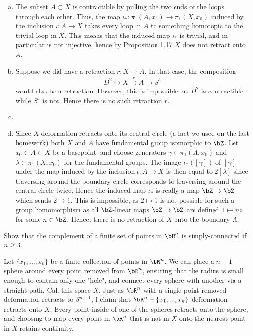 \begin{homework}[e]
\begin{prf}
\begin{enumerate}[(a)]
    \item The subset $A\subset X$ is contractible by pulling the two ends of the loops through each other. Thus, the map $\iota_*:\pi_1(A,x_0) \to \pi_1(X,x_0)$ induced by the inclusion $\iota:A\to X$ takes every loop in $A$ to something homotopic to the trivial loop in $X$. This means that the induced map $\iota_*$ is trivial, and in particular is not injective, hence by Proposition 1.17 $X$ does not retract onto $A$.
    \item Suppose we did have a retraction $r:X\to A$. In that case, the composition
      \begin{align*}
        D^2 \hookrightarrow X \xrightarrow{r} A \to S^1
      \end{align*}
      would also be a retraction. However, this is impossible, as $D^2$ is contractible while $S^1$ is not. Hence there is no such retraction $r$.
    \item 
    \item Since $X$ deformation retracts onto its central circle (a fact we used on the last homework) both $X$ and $A$ have fundamental group isomorphic to $\bZ$. Let $x_0 \in A \subset X$ be a basepoint, and choose generators $\gamma \in \pi_1(A,x_0)$ and $\lambda \in \pi_1(X,x_0)$ for the fundamental groups. The image $\iota_*([\gamma])$ of $[\gamma]$ under the map induced by the inclusion $\iota:A\to X$ is then equal to $2[\lambda]$ since traversing around the boundary circle corresponds to traversing around the central circle twice. Hence the induced map $\iota_*$ is really a map $\bZ\to \bZ$ which sends $2\mapsto 1$. This is impossible, as $2 \mapsto 1$ is not possible for such a group homomorphism as all $\bZ$-linear maps $\bZ\to \bZ$ are defined $1 \mapsto nz$ for some $n \in \bZ$. Hence, there is no retraction of $X$ onto the boundary $A$.
  \end{enumerate}
\end{prf}

\newpage

 Show that the complement of a finite set of points in $\bR^n$ is simply-connected if $n \geq 3$.

\begin{prf}
Let $\{x_1,...,x_k\}$ be a finite collection of points in $\bR^n$. We can place a ${n-1}$ sphere around every point removed from $\bR^n$, ensuring that the radius is small enough to contain only one "hole", and connect every sphere with another via a straight path. Call this space $X$. Just as $\bR^n$ with a single point removed deformation retracts to $S^{n-1}$, I claim that $\bR^n - \{x_1,...,x_k\}$ deformation retracts onto $X$. Every point inside of one of the spheres retracts onto the sphere, and choosing to map every point in $\bR^n$ that is not in $X$ onto the nearest point in $X$ retains continuity. 


\end{prf}
\end{homework}

